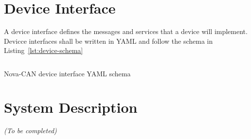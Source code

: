 \documentclass[a4paper,12pt]{article}
\begin{document}
\newpage
\section{Device Interface}
\label{sec:device-interface}
A device interface defines the messages and services that a device will implement. Devicce interfaces shall be written in YAML and follow the schema in Listing~\ref{lst:device-schema}
\begin{listing}[H]
    \inputminted[fontsize=\scriptsize, breaklines, frame=lines]{yaml}{../../schema/device_interface.yaml}
    \caption{Nova-CAN device interface YAML schema}
    \label{lst:device-schema}
\end{listing}
    
\section{System Description}
\label{sec:system-description}
\textit{(To be completed)}
\end{document}
